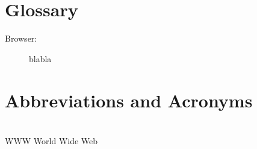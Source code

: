 \section{Glossary} %


\begin{description}
\item[Browser:] blabla
\end{description}


\newpage

\section{Abbreviations and Acronyms}

\begin{tabbing}
\hspace*{3cm}\=  \\ \kill
WWW \> World Wide Web\\
\end{tabbing}
